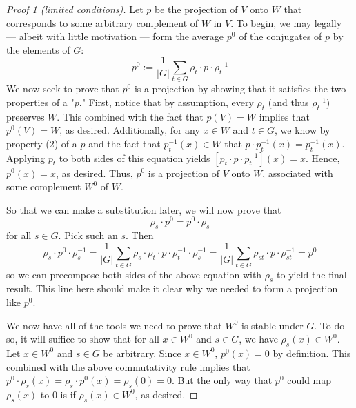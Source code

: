 \documentclass[../notes.tex]{subfiles}
\begin{document}
\begin{itemize}
\begin{theorem}
\begin{proof}[Proof 1 (limited conditions)]
            Let $p$ be the projection of $V$ onto $W$ that corresponds to some arbitrary complement of $W$ in $V$. To begin, we may legally --- albeit with little motivation --- form the average $p^0$ of the conjugates of $p$ by the elements of $G$:
            \begin{equation*}
                p^0 := \frac{1}{|G|}\sum_{t\in G}\rho_t\cdot p\cdot\rho_t^{-1}
            \end{equation*}
            We now seek to prove that $p^0$ is a projection by showing that it satisfies the two properties of a "$p$." First, notice that by assumption, every $\rho_t$ (and thus $\rho_t^{-1}$) preserves $W$. This combined with the fact that $p(V)=W$ implies that $p^0(V)=W$, as desired. Additionally, for any $x\in W$ and $t\in G$, we know by property (2) of a $p$ and the fact that $p_t^{-1}(x)\in W$ that $p\cdot p_t^{-1}(x)=p_t^{-1}(x)$. Applying $p_t$ to both sides of this equation yields $[p_t\cdot p\cdot p_t^{-1}](x)=x$. Hence, $p^0(x)=x$, as desired. Thus, $p^0$ is a projection of $V$ onto $W$, associated with some complement $W^0$ of $W$.\par
            So that we can make a substitution later, we will now prove that
            \begin{equation*}
                \rho_s\cdot p^0 = p^0\cdot\rho_s
            \end{equation*}
            for all $s\in G$. Pick such an $s$. Then
            \begin{equation*}
                \rho_s\cdot p^0\cdot\rho_s^{-1} = \frac{1}{|G|}\sum_{t\in G}\rho_s\cdot\rho_t\cdot p\cdot\rho_t^{-1}\cdot\rho_s^{-1}
                = \frac{1}{|G|}\sum_{t\in G}\rho_{st}\cdot p\cdot\rho_{st}^{-1}
                = p^0
            \end{equation*}
            so we can precompose both sides of the above equation with $\rho_s$ to yield the final result. This line here should make it clear why we needed to form a projection like $p^0$.\par
            We now have all of the tools we need to prove that $W^0$ is stable under $G$. To do so, it will suffice to show that for all $x\in W^0$ and $s\in G$, we have $\rho_s(x)\in W^0$. Let $x\in W^0$ and $s\in G$ be arbitrary. Since $x\in W^0$, $p^0(x)=0$ by definition. This combined with the above commutativity rule implies that $p^0\cdot\rho_s(x)=\rho_s\cdot p^0(x)=\rho_s(0)=0$. But the only way that $p^0$ could map $\rho_s(x)$ to 0 is if $\rho_s(x)\in W^0$, as desired.
        \end{proof}

\end{theorem}
\end{itemize}
\end{document}
